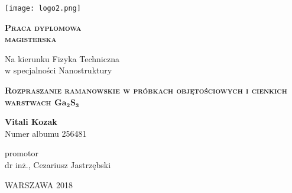 \begin{titlepage}
	\begin{table}[H]
		\begin{center}
			\texttt{[image: logo2.png]}
		\end{center}
	\end{table}
	
	\vspace{1cm}
	\begin{center}
		\textsc{\textbf{\Huge{Praca dyplomowa \\ \vspace{0.5cm} magisterska}}}
	\end{center}
	
	\vspace{2cm}
	\begin{center}
		Na kierunku Fizyka Techniczna \\
		w specjalności Nanostruktury
	\end{center}
	
	\vspace{1.5cm}
	\begin{center}
		\textsc{\textbf{\Large{Rozpraszanie ramanowskie w próbkach objętościowych i cienkich warstwach $\mathbf{Ga_{2}S_{3}}$}}}
	\end{center}

	\vspace{2.5cm}
	\begin{center}
		\textbf{\huge{Vitali Kozak}} \\ \vspace{0.3cm} Numer albumu 256481 
	\end{center}

	\vspace{1.5cm}
	\begin{center}
		promotor \\ \vspace{0.3cm} dr inż., Cezariusz Jastrzębski 
	\end{center}
	
	\vspace{1.5cm}
	\begin{center}
		WARSZAWA 2018
	\end{center}
\end{titlepage}
